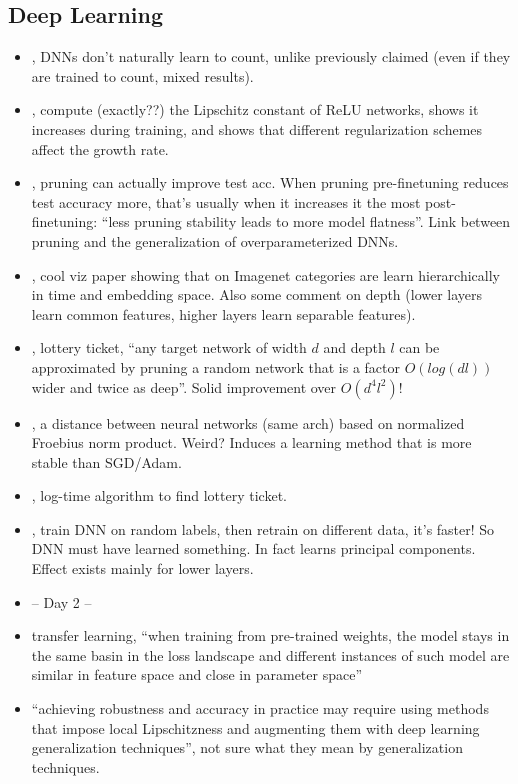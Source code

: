 \subsection{Deep Learning}
\begin{itemize}
\item \citet{zhang2020numerosity}, DNNs don't naturally learn to count, unlike previously claimed (even if they are trained to count, mixed results).
\item \citet{jordan2020exactly}, compute (exactly??) the Lipschitz constant of ReLU networks, shows it increases during training, and shows that different regularization schemes affect the growth rate.
\item \citet{bartoldson2020generalization}, pruning can actually improve test acc. When pruning pre-finetuning reduces test accuracy more, that's usually when it increases it the most post-finetuning: ``less pruning stability leads to more model flatness''. Link between pruning and the generalization of overparameterized DNNs.
\item \citet{doimo2020hierarchical}, cool viz paper showing that on Imagenet categories are learn hierarchically in time and embedding space. Also some comment on depth (lower layers learn common features, higher layers learn separable features).
\item \citet{pensia2020optimal}, lottery ticket, ``any target network of width $d$ and depth $l$ can be approximated by pruning a random network that is a factor $O(log(dl))$ wider and twice as deep''. Solid improvement over $O(d^4l^2)$!
\item \citet{bernstein2020distance}, a distance between neural networks (same arch) based on normalized Froebius norm product. Weird? Induces a learning method that is more stable than SGD/Adam.
\item \citet{ye2020greedy}, log-time algorithm to find lottery ticket.
\item \citet{maennel2020neural}, train DNN on random labels, then retrain on different data, it's faster! So DNN must have learned something. In fact learns principal components. Effect exists mainly for lower layers.
\item -- Day 2 --
\item \citet{neyshabur2020being} transfer learning, ``when training from pre-trained weights, the model stays in the same basin in the loss landscape and different instances of such model are similar in feature space and close in parameter space''
\item \citet{yang2020closer}  ``achieving robustness and accuracy in practice may require using methods that impose local Lipschitzness and augmenting them with deep learning generalization techniques'', not sure what they mean by generalization techniques.

\end{itemize}
